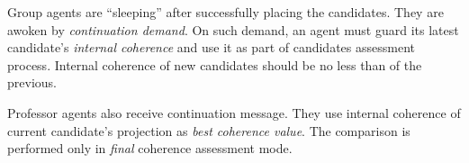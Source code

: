 \documentclass[../../header]{subfiles}
\begin{document}
Group agents are ``sleeping'' after successfully placing the candidates.
They are awoken by \emph{continuation demand}. On such demand, an agent
must guard its latest candidate's \emph{internal coherence} and use it as part
of candidates assessment process.
Internal coherence of new candidates should be no less than of the previous.

Professor agents also receive continuation message. They use internal coherence
of current candidate's projection as \emph{best coherence value}.
The comparison is performed only in \emph{final} coherence assessment mode.
\end{document}
